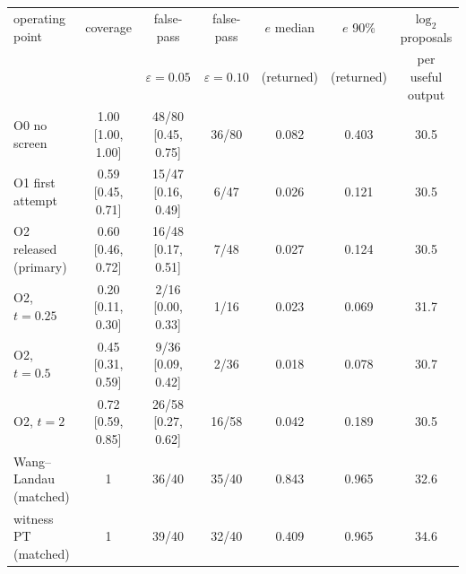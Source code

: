 \begin{tabular}{lcccccc}
\toprule
operating point & coverage & false-pass & false-pass & $e$ median & $e$ 90\% & $\log_2$ proposals \\
 & & $\varepsilon{=}0.05$ & $\varepsilon{=}0.10$ & (returned) & (returned) & per useful output \\
\midrule
O0 no screen & 1.00 [1.00, 1.00] & 48/80 [0.45, 0.75] & 36/80 & 0.082 & 0.403 & 30.5 \\
O1 first attempt & 0.59 [0.45, 0.71] & 15/47 [0.16, 0.49] & 6/47 & 0.026 & 0.121 & 30.5 \\
O2 released (primary) & 0.60 [0.46, 0.72] & 16/48 [0.17, 0.51] & 7/48 & 0.027 & 0.124 & 30.5 \\
O2, $t{=}0.25$ & 0.20 [0.11, 0.30] & 2/16 [0.00, 0.33] & 1/16 & 0.023 & 0.069 & 31.7 \\
O2, $t{=}0.5$ & 0.45 [0.31, 0.59] & 9/36 [0.09, 0.42] & 2/36 & 0.018 & 0.078 & 30.7 \\
O2, $t{=}2$ & 0.72 [0.59, 0.85] & 26/58 [0.27, 0.62] & 16/58 & 0.042 & 0.189 & 30.5 \\
\midrule
Wang--Landau (matched) & 1 & 36/40 & 35/40 & 0.843 & 0.965 & 32.6 \\
witness PT (matched) & 1 & 39/40 & 32/40 & 0.409 & 0.965 & 34.6 \\
\bottomrule
\end{tabular}
